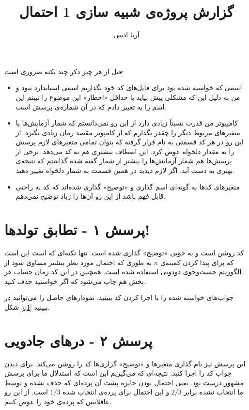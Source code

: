 \documentclass[11pt]{article}
\title{گزارش پروژه‌ی شبیه سازی 1 احتمال}
\author{آریا ادیبی}
\date{}
\theoremstyle{definition}
\theoremstyle{lemma}
\theoremstyle{remark}
\begin{document}
	\maketitle
	
	 قبل از هر چیز ذکر چند نکته ضروری است:
	 \begin{itemize}
	 	\item
	 	اسمی که خواسته شده بود برای فایل‌های کد خود بگذاریم اسمی استاندارد نبود و من به دلیل
	 	این که مشکلی پیش نیاید یا حداقل «اخطار» این موضوع را نبینم این اسم را به
	 	تغییر دادم که در آن
	 	شماره‌ی پرسش است.
	 	
	 	\item
	 	کامپیوتر من قدرت نسبتاً زیادی دارد از این رو نمی‌دانستم که شمار آزمایش‌ها یا متغیر‌های 
	 	مربوط دیگر را چقدر بگذارم که از کامپوتر مقصد زمان زیادی نگیرد. از این رو در هر کد 
	 	قسمتی به نام
	 	قرار گرفته که بتوان تمامی متغیر‌های لازم پرسش را به مقدار دلخواه عوض کرد. این انعطاف
	 	بیشتری هم به کد می‌دهد. برخی از پرسش‌ها هم شمار آزمایش‌ها را بیشتر از شمار گفته شده
	 	گذاشتم که نتیجه‌ی بهتری به دست آید. اگر لازم دیدید در همین قسمت به شمار دلخواه تغییر دهید.
	 	
	 	\item
	 	متغیر‌های کد‌ها به گونه‌ای اسم گذاری و «توضیح» گذاری شده‌اند که کد به راحتی قابل فهم باشد
	 	از این رو آن‌ها را زیاد توضیح نمی‌دهم.
	 \end{itemize}
 	
 	\section{پرسش ۱ - تطابق تولد‌ها!}
 	کد روشن است و به خوبی «توضیح» گذاری شده است. تنها نکته‌ای که است این است که برای پیدا کردن
 	کمینه‌ی 
 	$n$
 	به طوری که احتمال مورد نظر بیشتر مساوی 
 	شود از الگوریتم جست‌وجوی دودویی استفاده شده است.
 	همچنین در این کد زمان حساب هر بخش هم چاپ می‌شود که اگر خواستید حذف کنید.
 	
 	جواب‌های خواسته شده را با اجرا کردن کد ببینید. 
 	نمودار‌های حاصل را می‌توانید در
 	\textcolor{darkishBlue}{شکل}
 	\ref{q1}
 	ببینید.
	\section{پرسش ۲ - در‌های جادویی}
	این پرسش نیز نام گذاری متغیر‌ها و «توضیح» گزاری‌ها کد را روشن می‌کند. برای دیدن جواب
	کد را اجرا کنید.
	نتیجه‌ای که می‌گیریم این است که استدلال ما برای پرسش مشهور
	درست بود. یعنی احتمال بودن جایزه پشت آن پرده‌ای که حذف نشده و توسط ما انتخاب نشده 
	برابر 
	$2/3$
	و این احتمال برای پرده‌ی انتخاب شده 
	$1/3$
	است. از این رو عاقلانس که پرده‌ی خود را عوض کنیم.
\end{document}
